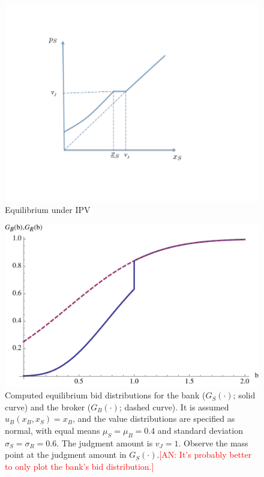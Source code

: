 \documentclass[11pt,twopage]{article}
\newcommand{\AN}[1]{\textcolor{red}{[AN: #1]}}
\begin{document}
%
\begin{figure}[t]
  \centering
  \includegraphics[scale=0.55]{graphics/equilibrium.pdf}
  \caption{Equilibrium under IPV\label{fig:equilibrium}}
\end{figure}

\begin{figure}[t]
  \centering
  \includegraphics[scale = 0.5]{graphics/model_equilibrium}
  \caption{Computed equilibrium bid distributions for the bank
    ($G_S(\cdot)$; solid curve) and the broker ($G_B(\cdot)$; dashed
    curve). It is assumed $u_B(x_B,x_S) = x_B$, and the value
    distributions are specified as normal, with equal means $\mu_S =
    \mu_B = 0.4$ and standard deviation $\sigma_S = \sigma_R =
    0.6$. The judgment amount is $v_J=1$. Observe the mass point at
    the judgment amount in $G_S(\cdot)$.\AN{It's probably better to
      only plot the bank's bid
      distribution.}\label{fig:model_equilibrium}}
\end{figure}
\end{document}
